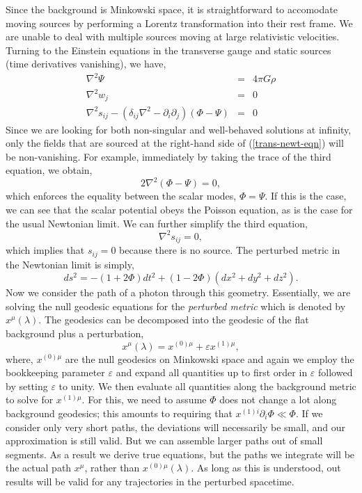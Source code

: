 Since the background is Minkowski space, it is straightforward to accomodate moving sources by performing a Lorentz transformation into their rest frame. We are unable to deal with multiple sources moving at large relativistic velocities. Turning to the Einstein equations in the transverse gauge and static sources (time derivatives vanishing), we have, 
\begin{eqnarray}\label{trans-newt-eqn}
    \nabla^2\Psi &=& 4\pi G\rho\nonumber\\
    \nabla^2w_j&=&0\nonumber\\
    \nabla^2s_{ij} - (\delta_{ij}\nabla^2 - \partial_i\partial_j)(\Phi-\Psi)&=&0
\end{eqnarray}
Since we are looking for both non-singular and well-behaved solutions at infinity, only the fields that are sourced at the right-hand side of (\ref{trans-newt-eqn}) will be non-vanishing. For example, immediately by taking the trace of the third equation, we obtain, 
\begin{equation}
    2\nabla^2(\Phi - \Psi)=0,
\end{equation}
which enforces the equality between the scalar modes, $\Phi = \Psi$. If this is the case, we can see that the scalar potential obeys the Poisson equation, as is the case for the usual Newtonian limit. We can further simplify the third equation, 
\begin{equation}
    \nabla^2s_{ij}=0,
\end{equation}
which implies that $s_{ij}=0$ because there is no source. The perturbed metric in the Newtonian limit is simply, 
\begin{equation}
    ds^2 = -(1+2\Phi)dt^2 + (1-2\Phi)(dx^2 + dy^2+dz^2).
\end{equation}
Now we consider the path of a photon through this geometry. Essentially, we are solving the null geodesic equations for the \textit{perturbed metric} which is denoted by $x^{\mu}(\lambda)$. The geodesics can be decomposed into the geodesic of the flat background plus a perturbation, 
\begin{equation}
    x^{\mu}(\lambda) = x^{(0)\mu} + \varepsilon x^{(1)\mu},
\end{equation}
where, $x^{(0)\mu}$ are the null geodesics on Minkowski space and again we employ the bookkeeping parameter $\varepsilon$ and expand all quantities up to first order in $\varepsilon$ followed by setting $\varepsilon$ to unity. We then evaluate all quantities along the background metric to solve for $x^{(1)\mu}$. For this, we need to assume $\Phi$ does not change a lot along background geodesics; this amounts to requiring that $x^{(1)i}\partial_{i}\Phi\ll\Phi$. If we consider only very short paths, the deviations will necessarily be small, and our approximation is still valid. But we can assemble larger paths out of small segments. As a result we derive true equations, but the paths we integrate will be the actual path $x^{\mu}$, rather than $x^{(0)\mu}(\lambda)$. As long as this is understood, out results will be valid for any trajectories in the perturbed spacetime. 

